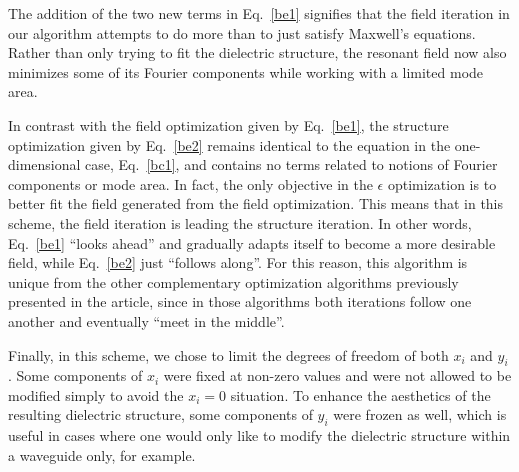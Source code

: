 The addition of the two new terms in Eq.~\eqref{be1} signifies that the field iteration in our algorithm attempts to do more than to just satisfy Maxwell's equations. Rather than only trying to fit the dielectric structure, the resonant field now also minimizes some of its Fourier components while working with a limited mode area. 

In contrast with the field optimization given by Eq.~\eqref{be1}, the structure optimization given by Eq.~\eqref{be2} remains identical to the equation in the one-dimensional case, Eq.~\eqref{bc1}, and contains no terms related to notions of Fourier components or mode area. In fact, the only objective in the $\epsilon$ optimization is to better fit the field generated from the field optimization. This means that in this scheme, the field iteration is leading the structure iteration. In other words, Eq.~\eqref{be1} ``looks ahead'' and gradually adapts itself to become a more desirable field, while Eq.~\eqref{be2} just ``follows along''. For this reason, this algorithm is unique from the other complementary optimization algorithms previously presented in the article, since in those algorithms both iterations follow one another and eventually ``meet in the middle''.

Finally, in this scheme, we chose to limit the degrees of freedom of both $x_i$ and $y_i$. Some components of $x_i$ were fixed at non-zero values and were not allowed to be modified simply to avoid the $x_i = 0$ situation. To enhance the aesthetics of the resulting dielectric structure, some components of $y_i$ were frozen as well, which is useful in cases where one would only like to modify the dielectric structure within a waveguide only, for example. 

